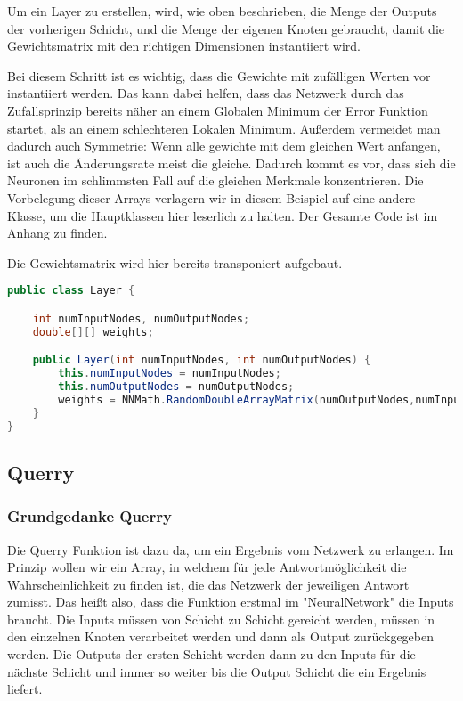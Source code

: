 \documentclass[12pt]{article}
\begin{document}
Um ein Layer zu erstellen, wird, wie oben beschrieben, die Menge der Outputs der vorherigen Schicht, und die Menge der eigenen Knoten gebraucht, damit die Gewichtsmatrix mit den richtigen Dimensionen instantiiert wird.

Bei diesem Schritt ist es wichtig, dass die Gewichte mit zufälligen Werten vor instantiiert werden. Das kann dabei helfen, dass das Netzwerk durch das Zufallsprinzip bereits näher an einem Globalen Minimum der Error Funktion startet, als an einem schlechteren Lokalen Minimum. Außerdem vermeidet man dadurch auch Symmetrie: Wenn alle gewichte mit dem gleichen Wert anfangen, ist auch die Änderungsrate meist die gleiche. Dadurch kommt es vor, dass sich die Neuronen im schlimmsten Fall auf die gleichen Merkmale konzentrieren. Die Vorbelegung dieser Arrays verlagern wir in diesem Beispiel auf eine andere Klasse, um die Hauptklassen hier leserlich zu halten. Der Gesamte Code ist im Anhang zu finden.

Die Gewichtsmatrix wird hier bereits transponiert aufgebaut.
\begin{lstlisting}[language=Java]
public class Layer {

    int numInputNodes, numOutputNodes;
    double[][] weights;

    public Layer(int numInputNodes, int numOutputNodes) {
        this.numInputNodes = numInputNodes;
        this.numOutputNodes = numOutputNodes;
        weights = NNMath.RandomDoubleArrayMatrix(numOutputNodes,numInputNodes);
    }
}
\end{lstlisting}


\subsection{Querry}
\subsubsection{Grundgedanke Querry}
Die Querry Funktion ist dazu da, um ein Ergebnis vom Netzwerk zu erlangen. Im Prinzip wollen wir ein Array, in welchem für jede Antwortmöglichkeit die Wahrscheinlichkeit zu finden ist, die das Netzwerk der jeweiligen Antwort zumisst.
Das heißt also, dass die Funktion erstmal im "NeuralNetwork" die Inputs braucht. Die Inputs müssen von Schicht zu Schicht gereicht werden, müssen in den einzelnen Knoten verarbeitet werden und dann als Output zurückgegeben werden. Die Outputs der ersten Schicht werden dann zu den Inputs für die nächste Schicht und immer so weiter bis die Output Schicht die ein Ergebnis liefert.
\end{document}
